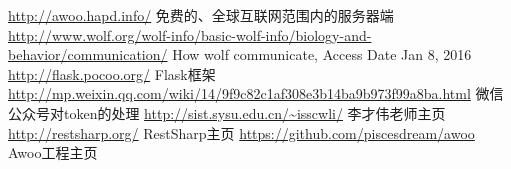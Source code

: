 \documentclass[a4paper,11pt]{article}
\begin{document}
\clearpage
\renewcommand\refname{参考文献}
\begin{thebibliography}{99}
     \url{http://awoo.hapd.info/} 免费的、全球互联网范围内的服务器端
     \url{http://www.wolf.org/wolf-info/basic-wolf-info/biology-and-behavior/communication/} How wolf communicate, Access Date Jan 8, 2016
     \url{http://flask.pocoo.org/} Flask框架
     \url{http://mp.weixin.qq.com/wiki/14/9f9c82c1af308e3b14ba9b973f99a8ba.html} 微信公众号对token的处理 
     \url{http://sist.sysu.edu.cn/~isscwli/} 李才伟老师主页
     \url{http://restsharp.org/} RestSharp主页
     \url{https://github.com/piscesdream/awoo} Awoo工程主页
\end{thebibliography}
\end{document}
